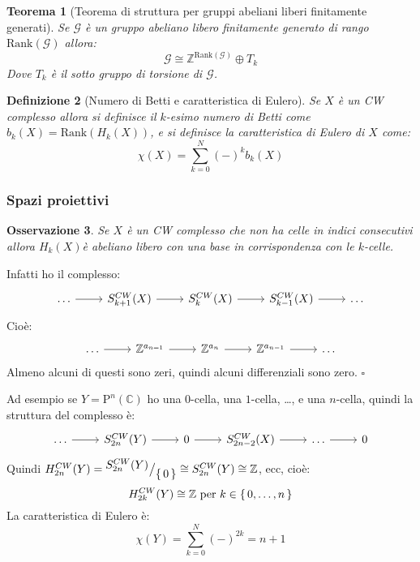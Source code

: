 \documentclass[10pt, twoside=false, x11names]{scrbook}
\newtheorem{theorem}{Teorema}[section]
\newtheorem{osservation}[theorem]{Osservazione}
\newtheorem{definition}[theorem]{Definizione}
\newenvironment{proof}{{\textbf{Dimostrazione}:}}{\hfill $\square$}
\newcommand{\Z}{\mathbb{Z}}
\newcommand{\rank}[1]{\mathrm{Rank}( #1 )}
\newcommand{\Pjc}[1]{\mathrm{P}^#1 (\mathbb{C})}
\newcommand*\quot[2]{{^{\textstyle #1}\big/_{\textstyle #2}}}
\begin{document}
\begin{theorem}[Teorema di struttura per gruppi abeliani liberi finitamente generati]
  Se $ \mathcal{G} $ è un gruppo abeliano libero finitamente generato di rango
  $ \rank{\mathcal{G}} $ allora:
  \[
    \mathcal{G} \cong \Z^{\rank{\mathcal{G}}} \oplus T_k
  \]
  Dove $ T_k $ è il sotto gruppo di torsione di $ \mathcal{G} $.
\end{theorem}

\begin{definition}[Numero di Betti e caratteristica di Eulero]
  Se $ X $ è un CW complesso allora si definisce il $ k $-esimo
  numero di Betti come $ b_k(X) = \rank{H_k(X)} $, e si definisce
  la caratteristica di Eulero di $ X $ come:
  \[
    \chi(X) = \sum_{k=0}^{N} (-)^k b_k(X)
  \]
\end{definition}

\subsubsection{Spazi proiettivi}

\begin{osservation}
  Se $ X $ è un CW complesso che non ha celle in indici consecutivi
  allora $ H_k(X) $è abeliano libero con una base in corrispondenza
  con le $ k $-celle.
\end{osservation}
\begin{proof}
  Infatti ho il complesso:
  \[
    \begin{tikzcd}
      \dots \rar & S^{CW}_{k+1}(X) \rar & S_k^{CW}(X) \rar & S_{k-1}^{CW}(X) \rar & \dots
    \end{tikzcd}
  \]
  Cioè:
  \[
    \begin{tikzcd}
      \dots \rar & \Z^{a_{n=1}} \rar & \Z^{a_n} \rar & \Z^{a_{n-1}} \rar & \dots
    \end{tikzcd}
  \]
  Almeno alcuni di questi sono zeri, quindi alcuni differenziali sono zero.
\end{proof}

Ad esempio se $ Y = \Pjc{n} $ ho una $ 0 $-cella, una $ 1 $-cella, \dots, e una
$ n $-cella, quindi la struttura del complesso è:
\[
  \begin{tikzcd}
    \dots \rar & S^{CW}_{2n}(Y) \rar & 0 \rar & S_{2n - 2}^{CW}(X) \rar & \dots \rar & 0
  \end{tikzcd}
\]
Quindi $ H_{2n}^{CW}(Y) = \quot{S^{CW}_{2n}(Y)}{\set{0}} \cong S_{2n}^{CW}(Y) \cong \Z $,
ecc, cioè:
\[
  H_{2k}^{CW}(Y) \cong \Z \text{ per } k \in \set{0, \dots, n}
\]
La caratteristica di Eulero è:
\[
  \chi(Y) = \sum_{k=0}^N (-)^{2k} = n + 1
\]
\end{document}
